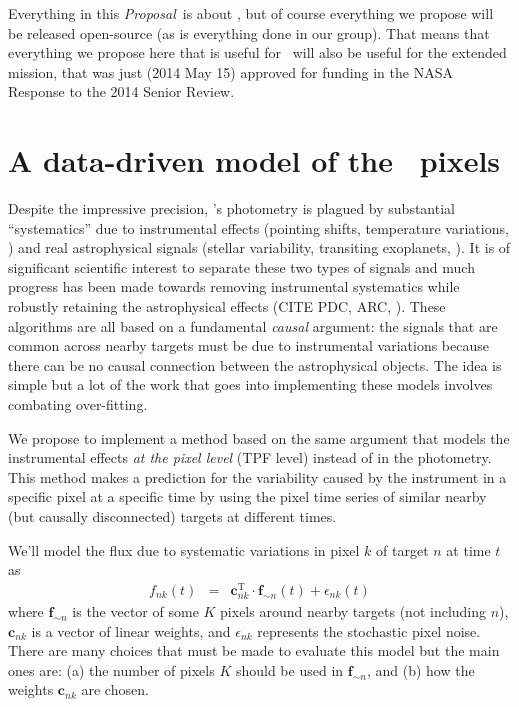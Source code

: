 \documentclass[letterpaper,12pt,preprint]{hack_aastex}
\newcommand{\bvec}[1]{{\ensuremath{{\boldsymbol{#1}}}}}
\newcommand{\documentname}{\textsl{Proposal}}
\begin{document}
Everything in this \documentname\ is about \Kepler, but of course everything we
propose will be released open-source (as is everything done in our group).
That means that everything we propose here that is useful for \Kepler\ will
also be useful for the  extended mission, that was just (2014 May 15)
approved for funding in the NASA Response to the 2014 Senior Review.

\section{A data-driven model of the \Kepler\ pixels}

Despite the impressive precision, \Kepler's photometry is plagued by
substantial ``systematics'' due to instrumental effects (pointing shifts,
temperature variations, \etc) and real astrophysical signals (stellar
variability, transiting exoplanets, \etc).
It is of significant scientific interest to separate these two types of
signals and much progress has been made towards removing instrumental
systematics while robustly retaining the astrophysical effects (CITE PDC, ARC,
\etc).
These algorithms are all based on a fundamental \emph{causal} argument: the
signals that are common across nearby targets must be due to instrumental
variations because there can be no causal connection between the astrophysical
objects.
The idea is simple but a lot of the work that goes into implementing these
models involves combating over-fitting.

We propose to implement a method based on the same argument that models the
instrumental effects \emph{at the pixel level} (TPF level)
instead of in the photometry.
This method makes a prediction for the variability caused by the instrument in
a specific pixel at a specific time by using the pixel time series of similar
nearby (but causally disconnected) targets at different times.

We'll model the flux due to systematic variations in pixel $k$ of target
$n$ at time $t$ as
\begin{eqnarray}
f_{nk}(t) &=& \bvec{c}_{nk}^\mathrm{T}\cdot\bvec{f}_{\sim n}(t)
              + \epsilon_{nk}(t)
\end{eqnarray}
where $\bvec{f}_{\sim n}$ is the vector of some $K$ pixels around nearby
targets (not including $n$), $\bvec{c}_{nk}$ is a vector of linear weights,
and $\epsilon_{nk}$ represents the stochastic pixel noise.
There are many choices that must be made to evaluate this model but the main
ones are: (a) the number of pixels $K$ should be used in $\bvec{f}_{\sim n}$,
and (b) how the weights $\bvec{c}_{nk}$ are chosen.
\end{document}

